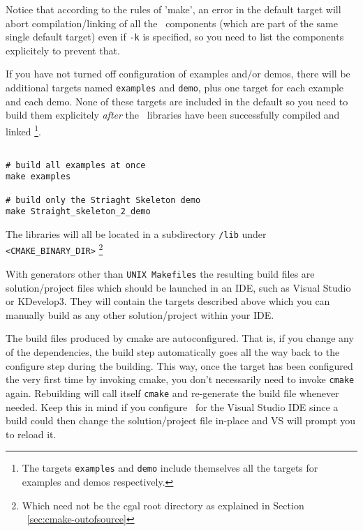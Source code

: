 Notice that according to the rules of 'make', an error in the default target will abort compilation/linking of
all the \cgal\ components (which are part of the same single default target) even if {\tt -k} 
is specified, so you need to list the components explicitely to prevent that.

If you have not turned off configuration of examples and/or demos, there will be additional
targets named {\tt examples} and {\tt demo}, plus one target for each example and each demo.
None of these targets are included in the default so you need to build them explicitely
{\em after} the \cgal\ libraries have been successfully compiled and linked
\footnote{The targets {\tt examples} and {\tt demo} include themselves all the targets
for examples and demos respectively.}.

{\ccTexHtml{\scriptsize}{}
\begin{verbatim}

# build all examples at once
make examples 

# build only the Striaght Skeleton demo
make Straight_skeleton_2_demo

\end{verbatim}
}

The libraries will all be located in a subdirectory {\tt /lib} under {\tt <CMAKE\_BINARY\_DIR>}
\footnote{Which need not be the cgal root directory as explained in Section ~\ref{sec:cmake-outofsource}}

With generators other than {\tt UNIX Makefiles} the resulting build files are solution/project files which
should be launched in an IDE, such as Visual Studio or KDevelop3. They will contain the targets described
above which you can manually build as any other solution/project within your IDE.

\begin{ccAdvanced}
The build files produced by cmake are autoconfigured. That is, if you change any 
of the dependencies, the build step automatically goes all the way back to the configure step
during the building. This way, once the target has been configured the very first time by
invoking cmake, you don't necessarily need to invoke \texttt{cmake} again. Rebuilding will call
itself \texttt{cmake} and re-generate the build file whenever needed. Keep this in mind if you
configure \cgal\ for the Visual Studio IDE since a build could then change the solution/project 
file in-place and VS will prompt you to reload it.
\end{ccAdvanced}


